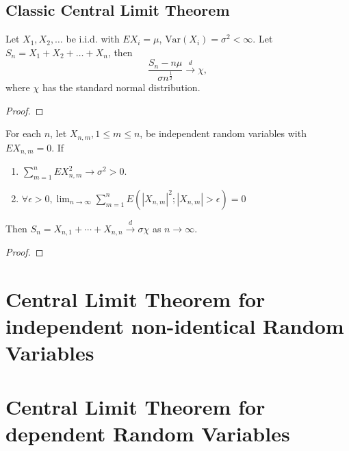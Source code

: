\subsection{Classic Central Limit Theorem}

\begin{theorem}
    Let $X_1,X_2,\ldots$ be i.i.d. with $EX_i=\mu$, $\text{Var}(X_i)=\sigma^2<\infty$. Let $S_n=X_1+X_2+\ldots+X_n$, then
    \begin{equation}
        \frac{S_n-n\mu}{\sigma n^{\frac{1}{2}}} \stackrel{d}{\rightarrow} \chi,
    \end{equation}
    where $\chi$ has the standard normal distribution.
\end{theorem}

\begin{proof}

\end{proof}

\begin{theorem}
    For each $n$, let $X_{n,m},1\leq m\leq n$, be independent random variables with $EX_{n,m}=0$. If
    \begin{enumerate}
        \item $\sum_{m=1}^{n}EX_{n,m}^{2} \rightarrow \sigma^{2}>0$.
        \item $\forall\epsilon>0,\lim_{n\rightarrow\infty}\sum_{m=1}^{n}E\left(\left|X_{n,m}\right|^{2};\left|X_{n,m}\right|>\epsilon\right)=0$
    \end{enumerate}
    Then $S_{n}=X_{n,1}+\cdots+X_{n,n}\stackrel{d}{\rightarrow}\sigma\chi$ as $n\rightarrow\infty$.
\end{theorem}

\begin{proof}

\end{proof}

\section{Central Limit Theorem for independent non-identical Random Variables}

\begin{theorem}
    
\end{theorem}

\section{Central Limit Theorem for dependent Random Variables}
